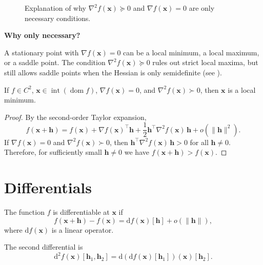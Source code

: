 \begin{figure}[ht]
    \centering
    \caption{Explanation of why $\nabla^2 f(\mathbf{x})\succeq 0$ and $\nabla f(\mathbf{x})=0$
    are only necessary conditions.}
    \label{fig:why-just-necessary}
\end{figure}

\noindent\textbf{Why only necessary?}

\noindent A stationary point with $\nabla f(\mathbf{x})=0$ can be a local minimum,
a local maximum, or a saddle point.
The condition $\nabla^2 f(\mathbf{x})\succeq 0$ rules out strict local maxima,
but still allows saddle points when the Hessian is only 
semidefinite (see ).

\begin{claim}
If $f \in C^{2}$, $\mathbf{x} \in \operatorname{int}(\operatorname{dom} f)$,
$\nabla f(\mathbf{x})=0$, and $\nabla^{2} f(\mathbf{x}) \succ 0$, then
$\mathbf{x}$ is a local minimum.
\end{claim}
\begin{proof}
By the second-order Taylor expansion,
\[
  f(\mathbf{x}+\mathbf{h})=f(\mathbf{x})+\nabla f(\mathbf{x})^\top \mathbf{h}
  +\frac{1}{2}\mathbf{h}^\top\nabla^2 f(\mathbf{x})\,
  \mathbf{h}+o(\|\mathbf{h}\|^2).
\]
If $\nabla f(\mathbf{x})=0$ and $\nabla^2 f(\mathbf{x})\succ 0$, then
$\mathbf{h}^\top\nabla^2 f(\mathbf{x})\,\mathbf{h}>0$ for all $\mathbf{h}\ne 0$.
Therefore, for sufficiently small $\mathbf{h}\ne 0$ we have
$f(\mathbf{x}+\mathbf{h})>f(\mathbf{x})$.
\end{proof}

\section{Differentials}

\begin{definition}
The function $f$ is differentiable at $\mathbf{x}$ if
\[
f(\mathbf{x}+\mathbf{h})-f(\mathbf{x})=\mathrm{d} f(\mathbf{x})[\mathbf{h}]+o(\|\mathbf{h}\|),
\]
where $\mathrm{d} f(\mathbf{x})$ is a linear operator.
\end{definition}

\begin{definition}
The second differential is
\[
\mathrm{d}^{2} f(\mathbf{x})\left[\mathbf{h}_{1}, \mathbf{h}_{2}\right]=
\mathrm{d}\left(\mathrm{d} f(\mathbf{x})\left[\mathbf{h}_{1}\right]\right)(\mathbf{x})
\left[\mathbf{h}_{2}\right].
\]
\end{definition}

